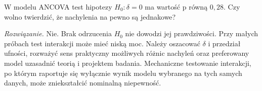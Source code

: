 \begin{zadanie}
W modelu ANCOVA test hipotezy $H_0:\delta=0$ ma wartość p równą $0{,}28$. Czy wolno twierdzić, że nachylenia na pewno są jednakowe?\par\emph{Rozwiązanie.} Nie. Brak odrzucenia $H_0$ nie dowodzi jej prawdziwości. Przy małych próbach test interakcji może mieć niską moc. Należy oszacować $\delta$ i przedział ufności, rozważyć sens praktyczny możliwych różnic nachyleń oraz preferowany model uzasadnić teorią i projektem badania. Mechaniczne testowanie interakcji, po którym raportuje się wyłącznie wynik modelu wybranego na tych samych danych, może zniekształcić nominalną niepewność.
\end{zadanie}


